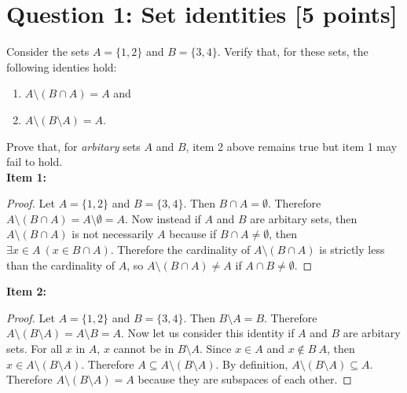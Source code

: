 \documentclass{report}
\theoremstyle{mytheoremstyle}
\theoremstyle{mytheoremstyle}
\theoremstyle{myproblemstyle}
\begin{document}
\section*{\Large{Question 1: Set identities [5 points]}}
Consider the sets $A = \{1, 2\}$ and $B = \{3, 4\}$. Verify that, for these sets, the following identies hold: 
\begin{enumerate}
    \item $A \setminus (B \cap A) = A$ and 
    \item $A \setminus (B \setminus A) = A$.
\end{enumerate} 
Prove that, for \textit{arbitary} sets $A$ and $B$, item 2 above remains true but item 1 may fail to hold.
\\[\baselineskip]
\textbf{Item 1:}
\begin{proof}
Let $A = \{1, 2\}$ and $B = \{3, 4\}$. Then $B \cap A = \emptyset$. Therefore $A \setminus (B \cap A) = A \setminus \emptyset = A$. Now instead if $A$ and $B$ are arbitary sets, then $A \setminus (B \cap A)$ is not necessarily $A$ because if $B \cap A \neq \emptyset$, then $\exists x \in A \: ( x \in B \cap A )$. Therefore the cardinality of $A \setminus (B \cap A)$ is strictly less than the cardinality of $A$, so $A \setminus (B \cap A) \neq A$ if $A \cap B \neq \emptyset$.
\end{proof}
\textbf{Item 2:}
\begin{proof}
Let $A = \{ 1, 2\}$ and $B = \{3, 4\}$. Then $B \setminus A = B$. Therefore $A \setminus (B \setminus A) = A \setminus B = A$. Now let us consider this identity if $A$ and $B$ are arbitary sets. For all $x$ in $A$, $x$ cannot be in $B \setminus A$. Since $x\in A$ and $x \notin B \ A$, then $x \in A \setminus (B \setminus A)$. Therefore $A \subseteq A \setminus (B \setminus A)$. By definition, $A \setminus (B \setminus A) \subseteq A$. Therefore $A \setminus (B \setminus A) = A$ because they are subspaces of each other.\end{proof} 
\newpage
\end{document}
